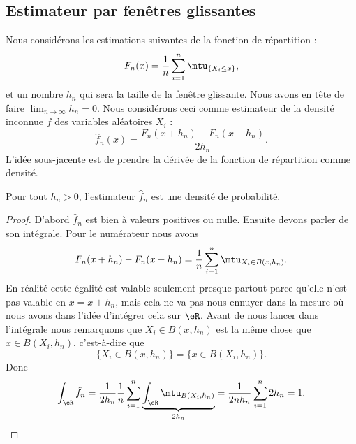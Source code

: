 \subsection{Estimateur par fenêtres glissantes}

Nous considérons les estimations suivantes de la fonction de répartition :
\begin{equation}
    F_n(x)=\frac{1}{ n }\sum_{i=1}^n\mtu_{\{ X_i\leq x \}},
\end{equation}
et un nombre \( h_n\) qui sera la taille de la fenêtre glissante. Nous avons en tête de faire \( \lim_{n\to \infty} h_n=0\). Nous considérons ceci comme estimateur de la densité inconnue \( f\) des variables aléatoires \( X_i\) :
\begin{equation}
    \hat f_n(x)=\frac{ F_n(x+h_n)-F_n(x-h_n) }{ 2h_n }.
\end{equation}
L'idée sous-jacente est de prendre la dérivée de la fonction de répartition comme densité.

\begin{lemma}
    Pour tout \( h_n>0\), l'estimateur \( \hat f_n\) est une densité de probabilité.
\end{lemma}

\begin{proof}
    D'abord \( \hat f_n\) est bien à valeurs positives ou nulle. Ensuite devons parler de son intégrale. Pour le numérateur nous avons
    \begin{equation}
        F_n(x+h_n)-F_n(x-h_n)=\frac{1}{ n }\sum_{i=1}^{n}\mtu_{X_i\in B(x,h_n)}.
    \end{equation}
    En réalité cette égalité est valable seulement presque partout parce qu'elle n'est pas valable en \( x=x\pm h_n\), mais cela ne va pas nous ennuyer dans la mesure où nous avons dans l'idée d'intégrer cela sur \( \eR\). Avant de nous lancer dans l'intégrale nous remarquons que \( X_i\in B(x,h_n)\) est la même chose que \( x\in B(X_i,h_n)\), c'est-à-dire que
    \begin{equation}
        \{ X_i\in B(x,h_n) \}=\{ x\in B(X_i,h_n) \}.
    \end{equation}
    Donc
    \begin{equation}
        \int_{\eR}\hat f_n=\frac{1}{ 2h_n }\frac{1}{ n }\sum_{i=1}^n\underbrace{\int_{\eR}\mtu_{B(X_i,h_n)}}_{2h_n}=\frac{1}{ 2nh_n }\sum_{i=1}^n2h_n=1.
    \end{equation}
\end{proof}

